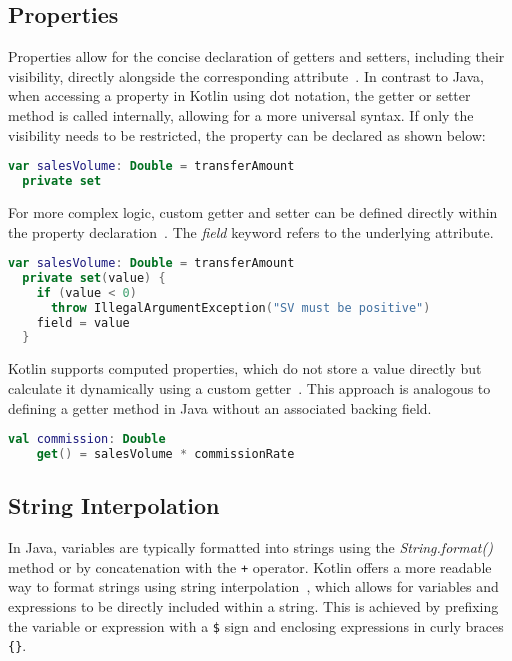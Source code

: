 \documentclass[a4paper, 11pt]{article}
\begin{document}
\subsection{Properties}
Properties allow for the concise declaration of getters and setters, including their visibility, directly alongside the corresponding attribute~\cite{declaring-properties,properties-getters-setters}.
In contrast to Java, when accessing a property in Kotlin using dot notation, the getter or setter method is called internally, allowing for a more universal syntax.
If only the visibility needs to be restricted, the property can be declared as shown below:

\begin{lstlisting}[language=Kotlin,title={Private setter}]
var salesVolume: Double = transferAmount
  private set
\end{lstlisting}

For more complex logic, custom getter and setter can be defined directly within the property declaration~\cite{properties-getters-setters}. 
The \textit{field} keyword refers to the underlying attribute. 

\begin{lstlisting}[language=Kotlin,title={Custom accessors}]
var salesVolume: Double = transferAmount
  private set(value) {
    if (value < 0)
      throw IllegalArgumentException("SV must be positive")
    field = value
  }
\end{lstlisting}

Kotlin supports computed properties, which do not store a value directly but calculate it dynamically using a custom getter~\cite{properties-getters-setters}. 
This approach is analogous to defining a getter method in Java without an associated backing field.

\begin{lstlisting}[language=Kotlin,title={Computed Property}]
  val commission: Double
    get() = salesVolume * commissionRate
\end{lstlisting}
\subsection{String Interpolation}
In Java, variables are typically formatted into strings using the \textit{String.format()} method or by concatenation with the \texttt{+} operator.
Kotlin offers a more readable way to format strings using string interpolation~\cite{string-concatenation}, which allows for variables and expressions to be directly included within a string.
This is achieved by prefixing the variable or expression with a \texttt{\$} sign and enclosing expressions in curly braces \texttt{\{\}}.
\end{document}
